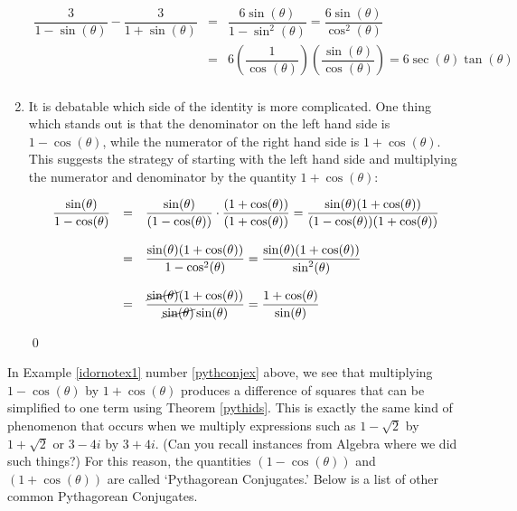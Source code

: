 \begin{ex}
\begin{enumerate}
\[\begin{array}{rcl}
\dfrac{3}{1-\sin(\theta)} - \dfrac{3}{1 + \sin(\theta)} & = & \dfrac{6 \sin(\theta)}{1 - \sin^{2}(\theta)}= \dfrac{6 \sin(\theta)}{\cos^{2}(\theta)} \\ [.25in]
& = &  6 \left(\dfrac{1}{\cos(\theta)}\right)\left( \dfrac{\sin(\theta)}{\cos(\theta)}\right) = 6 \sec(\theta) \tan(\theta) \\ \end{array} \]

\item  It is debatable which side of the identity is more complicated.  One thing which stands out is that the denominator on the left hand side is $1-\cos(\theta)$, while the numerator of the right hand side is $1+\cos(\theta)$.  This suggests the strategy of starting with the left hand side and multiplying the numerator and denominator by the quantity $1+\cos(\theta)$:

\[ \begin{array}{rcl}


\dfrac{\sin(\theta)}{1 - \cos(\theta)} & = & \dfrac{\sin(\theta)}{(1 - \cos(\theta))} \cdot \dfrac{(1 + \cos(\theta))}{(1 + \cos(\theta))} = \dfrac{\sin(\theta)(1 + \cos(\theta))}{(1 - \cos(\theta))(1 + \cos(\theta))} \\ [.25in]
& = & \dfrac{\sin(\theta)(1 + \cos(\theta))}{1 - \cos^{2}(\theta)} = \dfrac{\sin(\theta)(1 + \cos(\theta))}{\sin^{2}(\theta)} \\ [.25in]
& = & \dfrac{\cancel{\sin(\theta)}(1 + \cos(\theta))}{\cancel{\sin(\theta)}\sin(\theta)} = \dfrac{1 + \cos(\theta)}{\sin(\theta)} \end{array} \]

\vspace{-.1in} \qed

\end{enumerate}

\end{ex}

In Example \ref{idornotex1} number \ref{pythconjex} above,  we see that multiplying  $1-\cos(\theta)$ by $1+\cos(\theta)$ produces a difference of squares that can be simplified to one term using Theorem \ref{pythids}.  This is exactly the same kind of phenomenon that occurs when we multiply expressions such as $1 - \sqrt{2}$ by $1+\sqrt{2}$ or $3 - 4i$ by $3+4i$. (Can you recall instances from Algebra where we did such things?) For this reason, the quantities $(1-\cos(\theta))$ and $(1+\cos(\theta))$ are called `Pythagorean Conjugates.'  Below is a list of other common Pythagorean Conjugates.  

